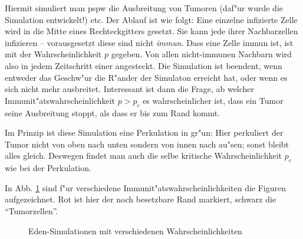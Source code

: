 \documentclass[a4paper]{book}
\begin{document}
Hiermit simuliert man pspw die Ausbreitung von Tumoren (daf"ur wurde
die Simulation entwickelt!) etc. Der Ablauf
ist wie folgt: Eine einzelne infizierte Zelle wird in die Mitte eines
Rechteckgitters gesetzt. Sie kann jede ihrer Nachbarzellen infizieren
-- vorausgesetzt diese sind nicht \emph{immun}. Dass eine Zelle immun
ist, ist mit der Wahrscheinlichkeit $p$ gegeben. Von allen
nicht-immunen Nachbarn wird also in jedem Zeitschritt einer
angesteckt. Die Simulation ist beendent, wenn entweder das Geschw"ur
die R"ander der Simulaton erreicht hat, oder wenn es sich nicht mehr
ausbreitet.  Interessant ist dann die Frage, ab welcher
Immunit"atswahrscheinlichkeit $p > p_c$ es wahrscheinlicher ist, dass
ein Tumor seine Ausbreitung stoppt, als dass er bis zum Rand kommt.

Im Prinzip ist diese Simulation eine Perkulation in gr"un: Hier
perkuliert der Tumor nicht von oben nach unten sondern von innen nach
au"sen; sonst bleibt alles gleich. Deswegen findet man auch die selbe
kritische Wahrscheinlichkeit $p_c$ wie bei der Perkulation.

In Abb. \ref{fig:eden} sind f"ur verschiedene
Immunit"atswahrscheinlichkeiten die Figuren aufgezeichnet. Rot ist
hier der noch besetzbare Rand markiert, schwarz die "`Tumorzellen"'.

\begin{figure}
  \centering
  \caption{Eden-Simulationen mit verschiedenen Wahrscheinlichkeiten}
  \label{fig:eden}
\end{figure}
\end{document}
